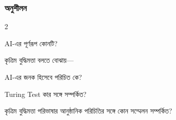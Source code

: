 \begin{topicbody}
\subsubsection{অনুশীলন}


\begin{multicols}{2}\begin{compactenum}
\item \begin{minipage}[t]{\linewidth}AI-এর পূর্ণরূপ কোনটি?\par {}\par\end{minipage}

\item \begin{minipage}[t]{\linewidth}কৃত্রিম বুদ্ধিমত্তা বলতে বোঝায়—\par {}\par\end{minipage}

\item \begin{minipage}[t]{\linewidth}AI-এর জনক হিসেবে পরিচিত কে?\par {}\par\end{minipage}

\item \begin{minipage}[t]{\linewidth}Turing Test কার সঙ্গে সম্পর্কিত?\par {}\par\end{minipage}

\item \begin{minipage}[t]{\linewidth}কৃত্রিম বুদ্ধিমত্তা পরিভাষার আনুষ্ঠানিক পরিচিতির সঙ্গে কোন সম্মেলন সম্পর্কিত?\par {}\par\end{minipage}


\end{compactenum}
\end{multicols}
\end{topicbody}
